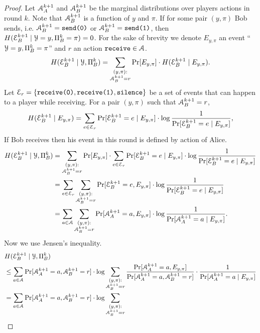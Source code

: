\begin{proof}
    Let $\mathcal{A}^{k+1}_A$ and $\mathcal{A}^{k+1}_B$ be the marginal distributions over players actions in round $k$. 
    Note that $\mathcal{A}^{k+1}_B$ is a function of $y$ and $\pi$. 
    If for some pair $(y,\pi)$ Bob sends, 
    i.e. $\mathcal{A}^{k+1}_B = \texttt{send(0)}$ or $\mathcal{A}^{k+1}_B = \texttt{send(1)}$, then $H(\mathcal{E}^{k+1}_B\mid\mathcal{Y}=y,\Pi^k_B=\pi) = 0$. For the sake of brevity we denote $E_{y,\pi}$ an event ``$\mathcal{Y}=y,\Pi^k_B=\pi$'' and $r$ an action $\texttt{receive} \in\mathcal{A}$.
    \[
    H(\mathcal{E}^{k+1}_B\mid\mathcal{Y},\Pi^k_B)
    =\sum_{\substack{(y,\pi):\\\mathcal{A}^{k+1}_B = r}}\Pr[E_{y,\pi}]\cdot H(\mathcal{E}^{k+1}_B\mid E_{y,\pi}).
    \]
    Let $\mathcal{E}_r = \{\texttt{receive(0)}, \texttt{receive(1)}, \texttt{silence}\}$ be a set of events that can happen to a player while receiving. For a pair $(y,\pi)$ such that  $\mathcal{A}_B^{k+1} = r$,
    \[
    H(\mathcal{E}^{k+1}_B\mid E_{y,\pi})=\sum_{e\in \mathcal{E}_r} \Pr[\mathcal{E}^{k+1}_B = e \mid E_{y,\pi}]\cdot \log\frac{1}{\Pr[\mathcal{E}^{k+1}_B = e \mid E_{y,\pi}]},
    \]
    If Bob receives then his event in this round is defined by action of Alice.    
    \begin{align*}
    H(\mathcal{E}^{k+1}_B\mid\mathcal{Y},\Pi^k_B)
    &=\sum_{\substack{(y,\pi):\\\mathcal{A}^{k+1}_B = r}}\Pr[E_{y,\pi}]\cdot
    \sum_{e\in \mathcal{E}_r} \Pr[\mathcal{E}^{k+1}_B = e \mid E_{y,\pi}]\cdot \log\frac{1}{\Pr[\mathcal{E}^{k+1}_B = e \mid E_{y,\pi}]}\\
    &=\sum_{e\in \mathcal{E}_r} \sum_{\substack{(y,\pi):\\\mathcal{A}^{k+1}_B = r}}
     \Pr[\mathcal{E}^{k+1}_B = e , E_{y,\pi}]\cdot \log\frac{1}{\Pr[\mathcal{E}^{k+1}_B = e \mid E_{y,\pi}]}\\
     &=\sum_{a\in \mathcal{A}} \sum_{\substack{(y,\pi):\\\mathcal{A}^{k+1}_B = r}}
     \Pr[\mathcal{A}^{k+1}_A = a , E_{y,\pi}]\cdot \log\frac{1}{\Pr[\mathcal{A}^{k+1}_A = a \mid E_{y,\pi}]}.
    \end{align*}
    Now we use Jensen's inequality.
    \begin{align*}
    &H(\cE^{k+1}_B\mid\cY,\Pi^k_B)\\
    &\le \sum_{a\in \cA} 
    \Pr[\cA^{k+1}_A = a , \cA^{k+1}_B = r]\cdot \log \sum_{\substack{(y,\pi):\\\cA^{k+1}_B = r}}
    \frac{\Pr[\cA^{k+1}_A = a , E_{y,\pi}]}{\Pr[\cA^{k+1}_A = a , \cA^{k+1}_B = r]}\cdot \frac{1}{\Pr[\cA^{k+1}_A = a \mid E_{y,\pi}]}\\
    &= \sum_{a\in \cA} 
    \Pr[\cA^{k+1}_A = a , \cA^{k+1}_B = r]\cdot \log \sum_{\substack{(y,\pi):\\\cA^{k+1}_B = r}}

\end{align*}
\end{proof}
